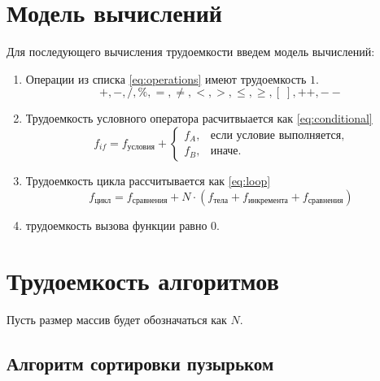 \section{Модель вычислений} 
Для последующего вычисления трудоемкости введем модель вычислений:
\begin{enumerate}[1.]
    \item Операции из списка \ref{eq:operations} имеют трудоемкость $1$. 
    \begin{equation}
        +,-,/,\%,=,\ne,<,>,\leq,\geq,[\;],++,--
        \label{operations}
    \end{equation}
    \item Трудоемкость условного оператора расчитвыается как \ref{eq:conditional}
    \begin{equation}
        f_{if} = f_{условия} + 
        \begin{cases}
            f_{A},& \text{если условие выполняется},\\
            f_{B},& \text{иначе}.
        \end{cases}
        \label{eq:conditional}
    \end{equation}
    \item Трудоемкость цикла рассчитывается как \ref{eq:loop}
    \begin{equation}
        f_{\text{цикл}} = f_{\text{сравнения}} + N \cdot (f_{\text{тела}} + f_{\text{инкремента}} + f_{\text{сравнения}})
        \label{eq:loop}
    \end{equation}
    \item трудоемкость вызова функции равно $0$.
\end{enumerate}

\section{Трудоемкость алгоритмов}
Пусть размер массив будет обозначаться как $N$.
\subsection{Алгоритм сортировки пузырьком}

